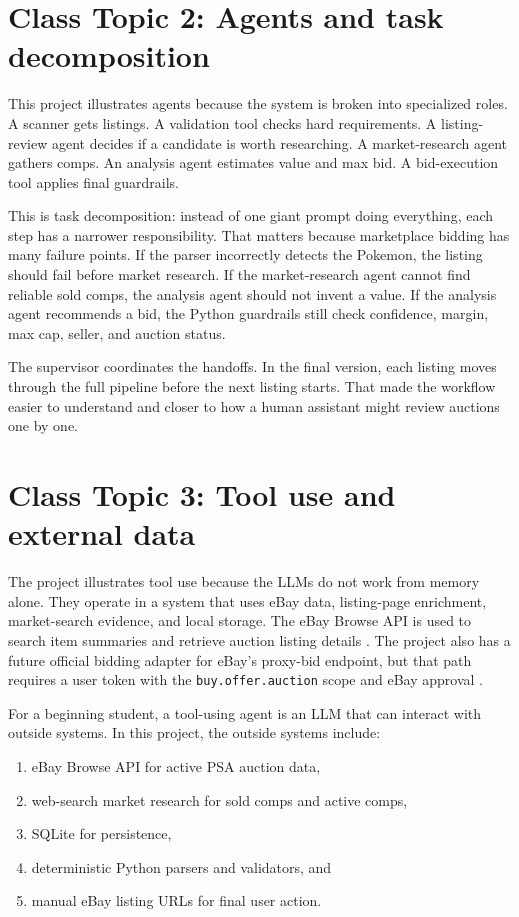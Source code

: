 \documentclass[10pt,twocolumn]{article}
\begin{document}
\section{Class Topic 2: Agents and task decomposition}

This project illustrates agents because the system is broken into specialized roles. A scanner gets listings. A validation tool checks hard requirements. A listing-review agent decides if a candidate is worth researching. A market-research agent gathers comps. An analysis agent estimates value and max bid. A bid-execution tool applies final guardrails.

This is task decomposition: instead of one giant prompt doing everything, each step has a narrower responsibility. That matters because marketplace bidding has many failure points. If the parser incorrectly detects the Pokemon, the listing should fail before market research. If the market-research agent cannot find reliable sold comps, the analysis agent should not invent a value. If the analysis agent recommends a bid, the Python guardrails still check confidence, margin, max cap, seller, and auction status.

The supervisor coordinates the handoffs. In the final version, each listing moves through the full pipeline before the next listing starts. That made the workflow easier to understand and closer to how a human assistant might review auctions one by one.

\section{Class Topic 3: Tool use and external data}

The project illustrates tool use because the LLMs do not work from memory alone. They operate in a system that uses eBay data, listing-page enrichment, market-search evidence, and local storage. The eBay Browse API is used to search item summaries and retrieve auction listing details \cite{ebaybrowse}. The project also has a future official bidding adapter for eBay's proxy-bid endpoint, but that path requires a user token with the \texttt{buy.offer.auction} scope and eBay approval \cite{ebayproxybid}.

For a beginning student, a tool-using agent is an LLM that can interact with outside systems. In this project, the outside systems include:
\begin{enumerate}[leftmargin=*]
    \item eBay Browse API for active PSA auction data,
    \item web-search market research for sold comps and active comps,
    \item SQLite for persistence,
    \item deterministic Python parsers and validators, and
    \item manual eBay listing URLs for final user action.
\end{enumerate}
\end{document}
